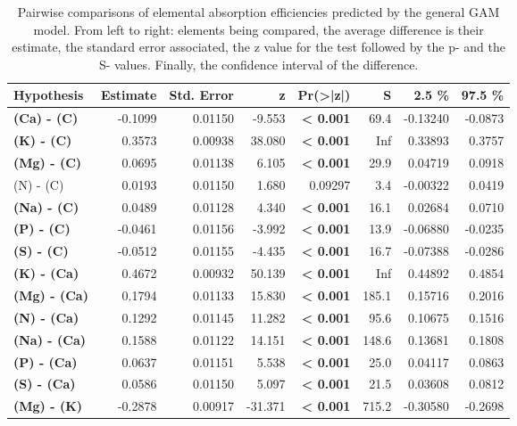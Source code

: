 \begin{table}[H]
\centering
\caption{\label{tab:table_pairs_i_ae}Pairwise comparisons of elemental absorption efficiencies predicted by the general GAM model. From left to right: elements being compared, the average difference is their estimate, the standard error associated, the z value for the test followed by the p- and the S- values. Finally, the confidence interval of the difference.}
\centering
\begin{tabular}[t]{>{}lrrr>{}rrrr}
\toprule
\textbf{Hypothesis} & \textbf{Estimate} & \textbf{Std. Error} & \textbf{z} & \textbf{Pr(>|z|)} & \textbf{S} & \textbf{2.5 \%} & \textbf{97.5 \%}\\
\midrule
\textbf{(Ca) - (C)} & -0.1099 & 0.01150 & -9.553 & \textbf{< 0.001} & 69.4 & -0.13240 & -0.0873\\
\textbf{(K) - (C)} & 0.3573 & 0.00938 & 38.080 & \textbf{< 0.001} & Inf & 0.33893 & 0.3757\\
\textbf{(Mg) - (C)} & 0.0695 & 0.01138 & 6.105 & \textbf{< 0.001} & 29.9 & 0.04719 & 0.0918\\
(N) - (C) & 0.0193 & 0.01150 & 1.680 & 0.09297 & 3.4 & -0.00322 & 0.0419\\
\textbf{(Na) - (C)} & 0.0489 & 0.01128 & 4.340 & \textbf{< 0.001} & 16.1 & 0.02684 & 0.0710\\
\textbf{(P) - (C)} & -0.0461 & 0.01156 & -3.992 & \textbf{< 0.001} & 13.9 & -0.06880 & -0.0235\\
\textbf{(S) - (C)} & -0.0512 & 0.01155 & -4.435 & \textbf{< 0.001} & 16.7 & -0.07388 & -0.0286\\
\textbf{(K) - (Ca)} & 0.4672 & 0.00932 & 50.139 & \textbf{< 0.001} & Inf & 0.44892 & 0.4854\\
\textbf{(Mg) - (Ca)} & 0.1794 & 0.01133 & 15.830 & \textbf{< 0.001} & 185.1 & 0.15716 & 0.2016\\
\textbf{(N) - (Ca)} & 0.1292 & 0.01145 & 11.282 & \textbf{< 0.001} & 95.6 & 0.10675 & 0.1516\\
\textbf{(Na) - (Ca)} & 0.1588 & 0.01122 & 14.151 & \textbf{< 0.001} & 148.6 & 0.13681 & 0.1808\\
\textbf{(P) - (Ca)} & 0.0637 & 0.01151 & 5.538 & \textbf{< 0.001} & 25.0 & 0.04117 & 0.0863\\
\textbf{(S) - (Ca)} & 0.0586 & 0.01150 & 5.097 & \textbf{< 0.001} & 21.5 & 0.03608 & 0.0812\\
\textbf{(Mg) - (K)} & -0.2878 & 0.00917 & -31.371 & \textbf{< 0.001} & 715.2 & -0.30580 & -0.2698\\

\end{tabular}
\end{table}
